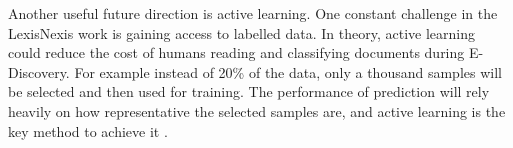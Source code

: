 \documentclass{sig-alternate-05-2015}
\theoremstyle{break}
\begin{document}
Another useful future direction is
active learning.
One constant challenge in the LexisNexis work is gaining access to labelled data. In theory,
active learning could reduce the cost of humans reading and classifying documents during E-Discovery.
For example  instead of 20\% of the data, only a thousand samples will be selected and then used for training. The performance of prediction will rely heavily on how representative the selected samples are, and active learning is the key method to achieve it \cite{tong2002support}. 









 

%
 \renewcommand{\baselinestretch}{0.9}
 
\balance

\small

\renewcommand{\baselinestretch}{1}

%
%
\end{document}

